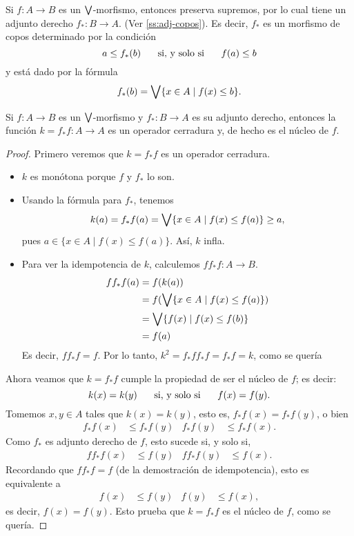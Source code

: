 Si $f:A\to B$ es un $\bigvee$-morfismo, entonces preserva supremos,
por lo cual tiene un adjunto derecho $f_*:B\to A$.
(Ver \ref{ss:adj-copos}).
Es decir, $f_*$ es un morfismo de copos determinado por la
condición
\[
    a\leq f_*(b) \hspace{5mm}\text{ si, y solo si }\hspace{5mm} f(a) \leq b
\]
y está dado por la fórmula
\[
    f_*(b) = \bigvee\{x\in A \mid f(x) \leq b\}
.\]
\begin{prop}
  Si $f:A\to B$ es un $\bigvee$-morfismo y $f_*:B\to A$ es su adjunto
  derecho, entonces la función $k=f_*f:A\to A$ es un operador
  cerradura y, de hecho es el núcleo de $f$.
\end{prop}
\begin{proof}
  Primero veremos que $k=f_*f$ es un operador cerradura.
  \begin{itemize}
    \item
    $k$ es monótona porque $f$ y $f_*$ lo son.
    \item 
    Usando la fórmula para $f_*$, tenemos
    \[
        k(a) = f_*f(a) = \bigvee\{x\in A \mid f(x) \leq f(a)\} \geq
        a
    ,\]
    pues $a\in\{x\in A\mid f(x)\leq f(a)\}$.
    Así, $k$ infla.
    \item
    Para ver la idempotencia de $k$, calculemos $ff_*f:A\to B$.
    \begin{align*}
        ff_*f(a)
        &= f(k(a)) \\
        &= f(\bigvee\{x\in A \mid f(x) \leq f(a) \}) \\
        &= \bigvee\{f(x) \mid f(x) \leq f(b) \} \\
        &= f(a)
    \end{align*}
    Es decir, $ff_*f=f$. Por lo tanto, $k^2 = f_*ff_*f=f_*f=k$,
    como se quería
\end{itemize}

Ahora veamos que $k=f_*f$ cumple la propiedad de ser el núcleo de
$f$; es decir:
\[
  k(x)=k(y) \hspace{5mm}\text{ si, y solo si }\hspace{5mm} f(x)=f(y)
.\]
Tomemos $x,y\in A$ tales que $k(x)=k(y)$,
esto es, $f_*f(x) = f_*f(y)$, o bien
\begin{align*}
  f_*f(x) &\leq f_*f(y)
  &
  f_*f(y) &\leq f_*f(x).
\end{align*}
Como $f_*$ es adjunto derecho de $f$, esto sucede si, y solo si,
\begin{align*}
  ff_*f(x) &\leq f(y)
  &
  ff_*f(y) &\leq f(x).
\end{align*}
Recordando que $ff_*f=f$ (de la demostración de idempotencia),
esto es equivalente a
\begin{align*}
  f(x) &\leq f(y)
  &
  f(y) &\leq f(x),
\end{align*}
es decir, $f(x)=f(y)$. Esto prueba que $k=f_*f$ es el núcleo de
$f$, como se quería.
\end{proof}


